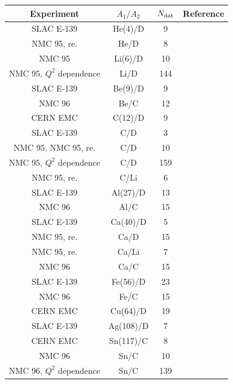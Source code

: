 \begin{table}[t]
  \centering
  \small
\begin{tabular}{c c c c}
\hline
Experiment & $A_1/A_2$ & $N_{\rm dat}$ & Reference\\
\hline
\hline
  SLAC E-139 & He(4)/D & 9 & \cite{PhysRevD.49.4348} \\
  NMC 95, re. & He/D & 8 & \cite{Amaudruz:1995tq}\\
\hline
  NMC 95 & Li(6)/D & 10 & \cite{Arneodo:1995cs}\\
  NMC 95, $Q^2$ dependence & Li/D & 144 &\cite{Arneodo:1995cs}\\
\hline
  SLAC E-139 & Be(9)/D & 9 & \cite{PhysRevD.49.4348}\\
  NMC 96 & Be/C & 12 & \cite{Arneodo:1996rv}\\
\hline
  CERN EMC & C(12)/D & 9 & \cite{Ashman:1992kv}\\
  SLAC E-139 & C/D & 3 & \cite{PhysRevD.49.4348}\\
  NMC 95, NMC 95, re.  & C/D & 10 & \cite{Arneodo:1995cs,Amaudruz:1995tq}\\
  NMC 95, $Q^2$ dependence & C/D & 159 & \cite{Arneodo:1995cs}\\
  NMC 95, re. & C/Li & 6 & \cite{Amaudruz:1995tq}\\
\hline
  SLAC E-139 & Al(27)/D & 13 & \cite{PhysRevD.49.4348}\\
  NMC 96 & Al/C & 15 & \cite{Arneodo:1996rv}\\
\hline
  SLAC E-139 & Ca(40)/D & 5 & \cite{PhysRevD.49.4348}\\
  NMC 95, re. & Ca/D & 15 & \cite{Amaudruz:1995tq}\\
  NMC 95, re. & Ca/Li & 7 & \cite{Amaudruz:1995tq}\\
  NMC 96 & Ca/C & 15 & \cite{Arneodo:1996rv}\\
\hline
  SLAC E-139 & Fe(56)/D & 23 & \cite{PhysRevD.49.4348}\\
  NMC 96 & Fe/C & 15 & \cite{Arneodo:1996rv}\\
\hline
  CERN EMC & Cu(64)/D & 19 & \cite{Ashman:1992kv}\\
\hline
  SLAC E-139 & Ag(108)/D & 7 & \cite{PhysRevD.49.4348}\\
\hline
 CERN EMC & Sn(117)/C & 8 & \cite{Ashman:1992kv}\\
 NMC 96 & Sn/C & 10 & \cite{Arneodo:1996rv}\\
 NMC 96, $Q^2$ dependence  & Sn/C & 139 & \cite{Arneodo:1996ru}\\

\end{tabular}
\end{table}
